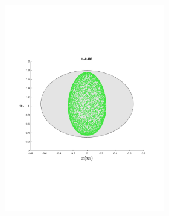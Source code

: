 \begin{figure}
{\begin{subfigure}{0.5\textwidth}
\begin{subfigure}[b]{0.5\textwidth}
        \includegraphics[trim={1cm 7cm 1cm 7cm},
        width=\textwidth]{figures/method/FunnelSimOverlaid15funnel-1y-theta}
      \end{subfigure}%
      \\
      \begin{subfigure}[b]{0.5\textwidth}

\end{subfigure}
\end{subfigure}}
\end{figure}
